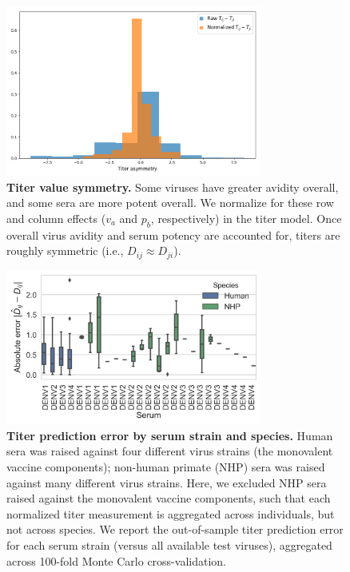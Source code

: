 \documentclass[11pt,oneside,letterpaper]{article}
\begin{document}
\begin{figure}[ht]
  \centering
  \includegraphics[width=0.75\textwidth]{../figures/png/titer_asymmetry.png}
  \caption{\textbf{Titer value symmetry.}
  Some viruses have greater avidity overall, and some sera are more potent overall.
  We normalize for these row and column effects ($v_a$ and $p_b$, respectively) in the titer model.
  Once overall virus avidity and serum potency are accounted for, titers are roughly symmetric (i.e., $D_{ij} \approx D_{ji}$).
  }
\label{titer_asymmetry}
\end{figure}

\begin{figure}[ht]
\centering
	\includegraphics[width=0.75\textwidth]{../figures/png/titer_species_error.png}
	\caption{\textbf{Titer prediction error by serum strain and species.}
  Human sera was raised against four different virus strains (the monovalent vaccine components); non-human primate (NHP) sera was raised against many different virus strains.
  Here, we excluded NHP sera raised against the monovalent vaccine components, such that each normalized titer measurement is aggregated across individuals, but not across species.
  We report the out-of-sample titer prediction error for each serum strain (versus all available test viruses), aggregated across 100-fold Monte Carlo cross-validation.
	}
	\label{species_titers}
\end{figure}
\end{document}
